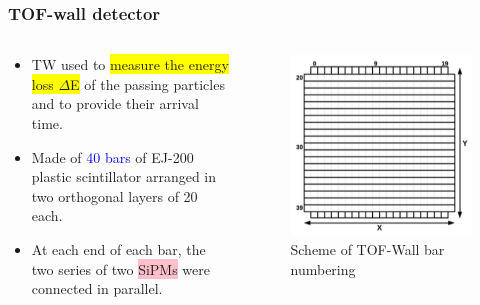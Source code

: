 
\begin{frame} [fragile]
	\frametitle{TOF-wall detector}
	\begin{columns}
  		\begin{column}{0.50\textwidth}
            \begin{itemize}
                \item TW used to \colorbox{yellow}{measure the energy loss $\Delta$E} of the passing particles and to provide their arrival time.
                \item Made of \textcolor{blue}{40 bars} of EJ-200 plastic scintillator arranged in two orthogonal layers of 20 each.
                \item At each end of each bar, the two series of two \colorbox{pink}{SiPMs} were connected in parallel.
            \end{itemize}
		\end{column}
    \begin{column}{0.50\textwidth}
 		\newline
			\begin{figure}
	  		    \centering
				\includegraphics[scale=0.15]{figures/tof_wall_scheme.png}
                \caption{Scheme of TOF-Wall bar numbering}
			\end{figure}
    \end{column}
\end{columns}
\end{frame}